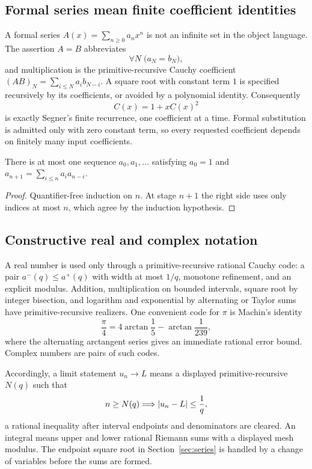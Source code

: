 \subsection{Formal series mean finite coefficient identities}

A formal series $A(x)=\sum_{n\ge0}a_nx^n$ is not an infinite set in the object
language.  The assertion $A=B$ abbreviates
\[
  \forall N\;\bigl(a_N=b_N\bigr),
\]
and multiplication is the primitive-recursive Cauchy coefficient
\((AB)_N=\sum_{i\le N}a_i b_{N-i}\).  A square root with constant term $1$ is
specified recursively by its coefficients, or avoided by a polynomial
identity.  Consequently
\[
 C(x)=1+xC(x)^2
\tag{1.2}\label{eq:formal-catalan}
\]
is exactly Segner's finite recurrence, one coefficient at a time.  Formal
substitution is admitted only with zero constant term, so every requested
coefficient depends on finitely many input coefficients.

\begin{lemma}
There is at most one sequence $a_0,a_1,\ldots$ satisfying $a_0=1$ and
$a_{n+1}=\sum_{i\le n}a_i a_{n-i}$.
\end{lemma}

\begin{proof}
Quantifier-free induction on $n$.  At stage $n+1$ the right side uses only
indices at most $n$, which agree by the induction hypothesis.
\end{proof}

\subsection{Constructive real and complex notation}

A real number is used only through a primitive-recursive rational Cauchy code:
a pair $a^-(q)\le a^+(q)$ with width at most $1/q$, monotone refinement, and
an explicit modulus.  Addition, multiplication on bounded intervals, square
root by integer bisection, and logarithm and exponential by alternating or
Taylor sums have primitive-recursive realizers.  One convenient code for
$\pi$ is Machin's identity
\[
 \frac\pi4=4\arctan\frac15-\arctan\frac1{239},
\]
where the alternating arctangent series gives an immediate rational error
bound.  Complex numbers are pairs of such codes.

Accordingly, a limit statement $u_n\to L$ means a displayed
primitive-recursive $N(q)$ such that
\[
 n\ge N(q)\Longrightarrow \left|u_n-L\right|\le \frac1q,
\]
a rational inequality after interval endpoints and denominators are cleared.
An integral means upper and lower rational Riemann sums with a displayed mesh
modulus.  The endpoint square root in Section~\ref{sec:series} is handled by a
change of variables before the sums are formed.

